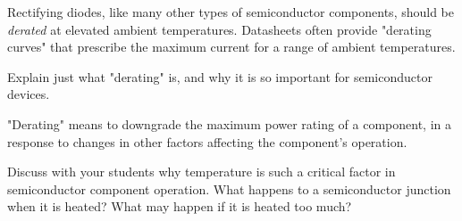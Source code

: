 

Rectifying diodes, like many other types of semiconductor components, should be {\it derated} at elevated ambient temperatures.  Datasheets often provide "derating curves" that prescribe the maximum current for a range of ambient temperatures.

Explain just what "derating" is, and why it is so important for semiconductor devices.







"Derating" means to downgrade the maximum power rating of a component, in a response to changes in other factors affecting the component's operation.







Discuss with your students why temperature is such a critical factor in semiconductor component operation.  What happens to a semiconductor junction when it is heated?  What may happen if it is heated too much?




